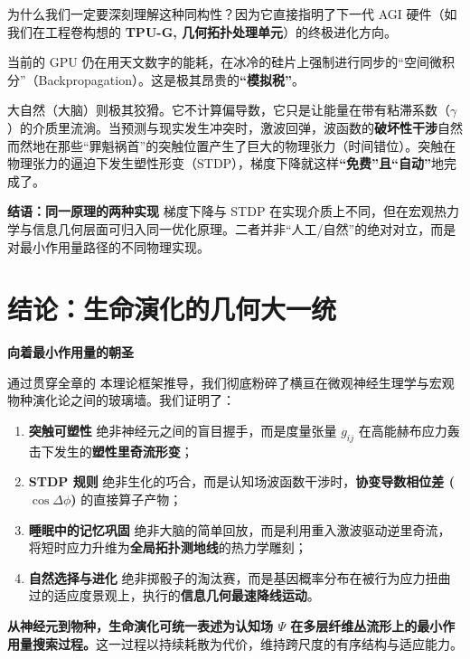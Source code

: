 
为什么我们一定要深刻理解这种同构性？因为它直接指明了下一代 AGI 硬件（如我们在工程卷构想的 \textbf{TPU-G, 几何拓扑处理单元}）的终极进化方向。

当前的 GPU 仍在用天文数字的能耗，在冰冷的硅片上强制进行同步的“空间微积分”（Backpropagation）。这是极其昂贵的\textbf{“模拟税”}。

大自然（大脑）则极其狡猾。它不计算偏导数，它只是让能量在带有粘滞系数（$\gamma$）的介质里流淌。当预测与现实发生冲突时，激波回弹，波函数的\textbf{破坏性干涉}自然而然地在那些“罪魁祸首”的突触位置产生了巨大的物理张力（时间错位）。突触在物理张力的逼迫下发生塑性形变（STDP），梯度下降就这样\textbf{“免费”且“自动”}地完成了。

\textbf{结语：同一原理的两种实现} 梯度下降与 STDP 在实现介质上不同，但在宏观热力学与信息几何层面可归入同一优化原理。二者并非“人工/自然”的绝对对立，而是对最小作用量路径的不同物理实现。

\section{结论：生命演化的几何大一统}
\label{sec:conclusion_geometric_grand_unification}

\begin{bquote}
    \textbf{向着最小作用量的朝圣}
\end{bquote}

通过贯穿全章的 本理论框架推导，我们彻底粉碎了横亘在微观神经生理学与宏观物种演化论之间的玻璃墙。我们证明了：

\begin{enumerate}
    \item \textbf{突触可塑性} 绝非神经元之间的盲目握手，而是度量张量 $g_{ij}$ 在高能赫布应力轰击下发生的\textbf{塑性里奇流形变}；
    \item \textbf{STDP 规则} 绝非生化的巧合，而是认知场波函数干涉时，\textbf{协变导数相位差 ($\cos \Delta\phi$)} 的直接算子产物；
    \item \textbf{睡眠中的记忆巩固} 绝非大脑的简单回放，而是利用重入激波驱动逆里奇流，将短时应力升维为\textbf{全局拓扑测地线}的热力学雕刻；
    \item \textbf{自然选择与进化} 绝非掷骰子的淘汰赛，而是基因概率分布在被行为应力扭曲过的适应度景观上，执行的\textbf{信息几何最速降线运动}。
\end{enumerate}

\textbf{从神经元到物种，生命演化可统一表述为认知场 $\Psi$ 在多层纤维丛流形上的最小作用量搜索过程。}这一过程以持续耗散为代价，维持跨尺度的有序结构与适应能力。

